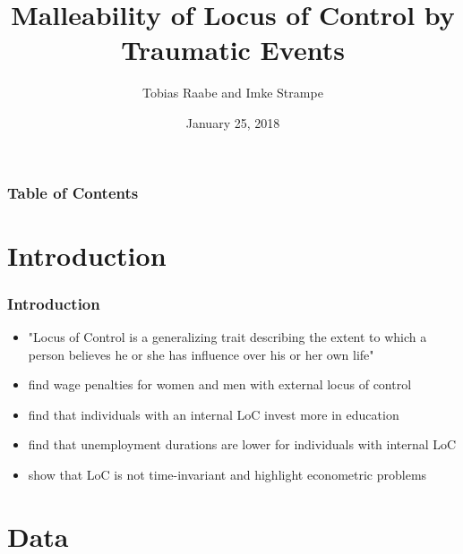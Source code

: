 \documentclass{beamer}
\date{January 25, 2018}
\author[Raabe and Strampe]{Tobias Raabe and Imke Strampe}
\title{Malleability of Locus of Control by Traumatic Events}
\institute[Uni Bonn]{University of Bonn}
\begin{document}
\begin{frame}[t]

\titlepage

\end{frame}

\begin{frame}[t]\frametitle{Table of Contents}

\tableofcontents

\end{frame}

\section{Introduction} %
\label{sec:introduction}

\begin{frame}[t]\frametitle{Introduction}

\begin{itemize}[<+->]
    \item "Locus of Control is a generalizing trait describing the extent to which a person believes he or she has influence over his or her own life" \citep{specht2013}
    \item \citet{heineck2010} find wage penalties for women and men with external locus of control
    \item \citet{piatek2010} find that individuals with an internal LoC invest more in education
    \item \citet{gallo2003} find that unemployment durations are lower for individuals with internal LoC
    \item \citet{cobb2013} show that LoC is not time-invariant and highlight econometric problems
\end{itemize}


\end{frame}


\section{Data} %
\label{sec:data}
\end{document}
